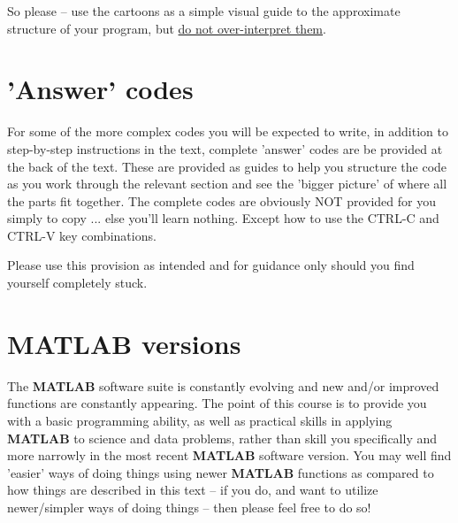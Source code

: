 \documentclass{tufte-book} %
\begin{document}
So please -- use the cartoons as a simple visual guide to the approximate structure of your program, but \uline{do not over-interpret them}.


\section{'Answer' codes}

For some of the more complex codes you will be expected to write, in addition to step-by-step instructions in the text, complete 'answer' codes are be provided at the back of the text. These are provided as guides to help you structure the code as you work through the relevant section and see the 'bigger picture' of where all the parts fit together. The complete codes are obviously NOT provided for you simply to copy ... else you'll learn nothing. Except how to use the \textsf{CTRL-C} and \textsf{CTRL-V} key combinations.

Please use this provision as intended and for guidance only should you find yourself completely stuck.


\section{\textbf{MATLAB} versions}

The \textbf{MATLAB} software suite is constantly evolving and new and/or improved functions are constantly appearing. The point of this course is to provide you with a basic programming ability, as well as practical skills in applying \textbf{MATLAB} to science and data problems, rather than skill you specifically and more narrowly in the most recent \textbf{MATLAB} software version. You may well find 'easier' ways of doing things using newer \textbf{MATLAB} functions as compared to how things are described in this text --  if you do, and want to utilize newer/simpler ways of doing things -- then please feel free to do so!


\mainmatter

\end{document}
